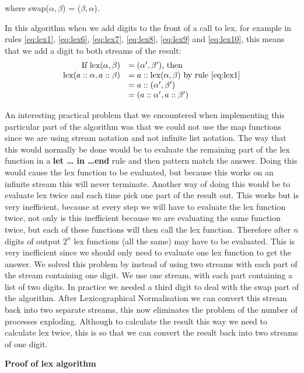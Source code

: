 \documentclass{cs4rep}
\begin{document}
where swap($\alpha, \beta$) = ($\beta,\alpha$).

In this algorithm when we add digits to the front of a call to lex,
for example in rules \ref{eq:lex1}, \ref{eq:lex6}, \ref{eq:lex7},
\ref{eq:lex8}, \ref{eq:lex9} and \ref{eq:lex10}, this means that we
add a digit to both streams of the result:
\[ \begin{array}{rl}
\mbox{If } \mbox{lex}(\alpha,\beta) & = (\alpha',\beta') \mbox{, then } \\
\mbox{lex}(a::\alpha,a::\beta) & = a::\mbox{lex}(\alpha,\beta) \mbox{ by rule } \ref{eq:lex1} \\
& = a::(\alpha',\beta') \\
& = (a::\alpha', a::\beta')
\end{array} \]

An interesting practical problem that we encountered when implementing this
particular part of the algorithm was that we could not use the map
functions since we are using stream notation and not infinite list
notation. The way that this would normally be done would be to
evaluate the remaining part of the lex function in a {\bf let \ldots
  in \ldots end} rule and then pattern match the answer. Doing this
would cause the lex function to be evaluated, but because this works
on an infinite stream this will never terminate. Another way of doing
this would be to evaluate lex twice and each time pick one part of the
result out. This works but is very inefficient, because at every step
we will have to evaluate the lex function twice, not only is this
inefficient because we are evaluating the same function twice, but
each of these functions will then call the lex function. Therefore after
$n$ digits of output $2^{n}$ lex functions (all the same) may have to
be evaluated. This is very inefficient since we should only need to
evaluate one lex function to get the answer.  We solved this problem
by instead of using two streams with each part of the stream
containing one digit. We use one stream, with each part containing a
list of two digits. In practice we needed a third digit to deal with
the swap part of the algorithm. After Lexicographical Normalisation we
can convert this stream back into two separate streams, this now
eliminates the problem of the number of processes exploding. Although
to calculate the result this way we need to calculate lex twice, this
is so that we can convert the result back into two streams of one
digit.

{\bf Proof of lex algorithm}
\end{document}
